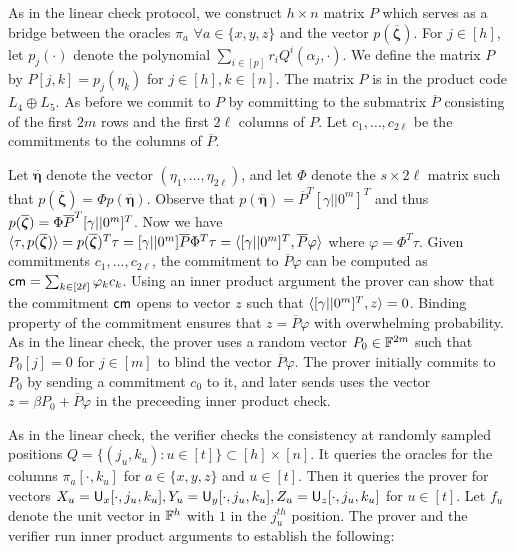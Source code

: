  As in the linear check protocol, we
construct $h\times n$ matrix $P$ which serves as a bridge between the oracles
$\pi_a$ $\forall a \in \{x,y,z\}$ and the vector $p(\overline{\bm{\zeta}})$.
For $j\in [h]$, let $p_j(\cdot)$ denote the polynomial $\sum_{i\in[p]}
r_iQ^i(\alpha_j, \cdot)$. We define the matrix $P$ by $P[j,k]= p_j(\eta_k)$ for
$j\in[h], k\in[n]$. The matrix $P$ is in the product code $L_4\oplus L_5$. As
before we commit to $P$ by committing to the submatrix $\overline{P}$
consisting of the first $2m$ rows and the first $2\ell$ columns of $P$. Let
$c_1,\ldots,c_{2\ell}$ be the commitments to the columns of $\overline{P}$.

 Let
$\overline{\bm{\eta}}$ denote the vector $(\eta_1, \ldots, \eta_{2\ell})$, and
let $\Phi$ denote the $s\times 2\ell$ matrix such that
$p(\overline{\bm{\zeta}}) = \Phi p(\overline{\bm{\eta}})$. Observe
that $p(\overline{\bm{\eta}}) = \overline{P}^T [\gamma||0^m]^T$ and thus
$p(\overline{\bm{\zeta}}) = \Phi \overline{P}^T [\gamma||0^m]^T$. Now we have
$\langle \tau,p(\overline{\bm{\zeta}})\rangle = p(\overline{\bm{\zeta}})^T \tau = [\gamma||0^m] \overline{P}
\Phi^T \tau = \langle [\gamma||0^m]^T,\overline{P}\varphi\rangle$ where $\varphi =
\Phi^T \tau$. Given commitments $c_1, \ldots, c_{2\ell}$, the commitment to
$\overline{P}\varphi$ can be computed as $\mathsf{cm} = \sum_{k\in[2\ell]} \varphi_k
c_k$. Using an inner product argument the prover can show that the commitment
$\mathsf{cm}$ opens to vector $z$ such that $\langle [\gamma||0^m]^T,z\rangle = 0$. Binding
property of the commitment ensures that $z = \overline{P}\varphi$ with
overwhelming probability.
As in the linear check, the prover uses a random vector $P_0\in \mathbb{F}^{2m}$ such
that $P_0[j]=0$ for $j\in [m]$ to blind the vector $\overline{P}\varphi$. The
prover initially commits to $P_0$ by sending a commitment $c_0$ to it, and later
sends uses the vector $z=\beta P_0 + \overline{P}\varphi$ in the preceeding
inner product check.

As in the linear check, the verifier checks
the consistency at randomly sampled positions $Q=\{(j_u,k_u) : u\in[t] \}
\subset [h]\times[n]$. It queries the oracles for the columns
$\pi_a[\cdot, k_u]$ for $a\in \{x,y,z\}$ and $u\in [t]$. 
Then it queries the prover for vectors $X_u = \mathsf{U}_x[\cdot,j_u,k_u], Y_u =
\mathsf{U}_y[\cdot, j_u,k_u], Z_u = \mathsf{U}_z[\cdot,j_u,k_u]$ for $u\in [t]$. Let
$f_u$ denote the unit vector in $\mathbb{F}^h$ with $1$ in the $j_u^{th}$ position. The
prover and the verifier run inner product arguments to establish the following: 

